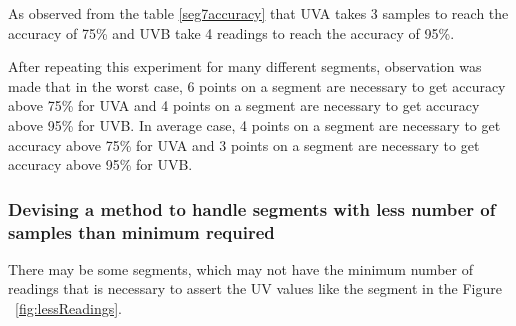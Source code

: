 \documentclass[12pt,fullpage,doublespace]{article}
\begin{document}
As observed from the table \ref{seg7accuracy} that UVA takes 3 samples to reach the accuracy of 75\% and UVB take 4 readings to reach the accuracy of 95\%. 
\newpage


\newpage
After repeating this experiment for many different segments, observation was made that in the worst case, 6 points on a segment are necessary to get accuracy above 75\% for UVA and 4 points on a segment are necessary to get accuracy above 95\% for UVB.
In average case, 4 points on a segment are necessary to get accuracy above 75\% for UVA and  3 points on a segment are necessary to get accuracy above 95\% for UVB.


\subsubsection{Devising a method to handle segments with less number of samples than minimum required}
There may be some segments, which may not have the minimum number of readings that is necessary to assert the UV values like the segment in the Figure ~\ref{fig:lessReadings}. 
\end{document}
